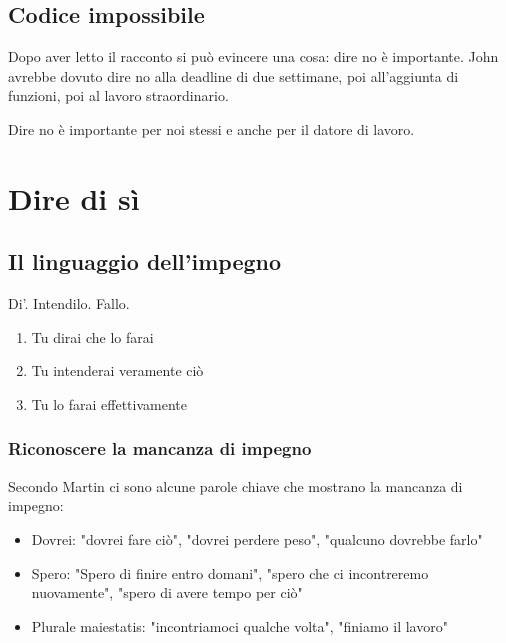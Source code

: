 \documentclass[11pt,a4paper]{book}
\begin{document}
\section{Codice impossibile}
Dopo aver letto il racconto si può evincere una cosa: dire no è importante. John avrebbe dovuto dire no alla deadline di due settimane, poi all'aggiunta di funzioni, poi al lavoro straordinario. 

Dire no è importante per noi stessi e anche per il datore di lavoro.

\chapter{Dire di sì}
\section{Il linguaggio dell'impegno}
Di'. Intendilo. Fallo.
\begin{enumerate}
	\item Tu dirai che lo farai
	\item Tu intenderai veramente ciò
	\item Tu lo farai effettivamente
\end{enumerate}

\subsection{Riconoscere la mancanza di impegno}
Secondo Martin ci sono alcune parole chiave che mostrano la mancanza di impegno:
\begin{itemize}
	\item Dovrei: "dovrei fare ciò", "dovrei perdere peso", "qualcuno dovrebbe farlo"
	\item Spero: "Spero di finire entro domani", "spero che ci incontreremo nuovamente", "spero di avere tempo per ciò"
	\item Plurale maiestatis: "incontriamoci qualche volta", "finiamo il lavoro"
\end{itemize}
\end{document}
